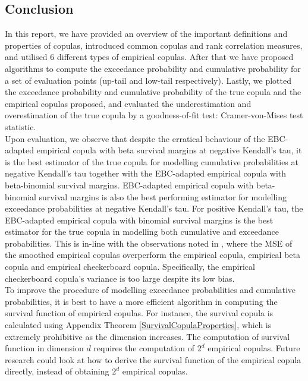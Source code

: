 \documentclass[12pt]{report}
\newcommand{\1}{\mathbf{1}}
\begin{document}
\begin{flushleft}
\section{Conclusion}
\vspace{0.5cm}
In this report, we have provided an overview of the important definitions and properties of copulas, introduced common copulas and rank correlation measures, and utilised 6 different types of empirical copulas. After that we have proposed algorithms to compute the exceedance probability and cumulative probability for a set of evaluation points (up-tail and low-tail respectively). Lastly, we plotted the exceedance probability and cumulative probability of the true copula and the empirical copulas proposed, and evaluated the underestimation and overestimation of the true copula by a goodness-of-fit test: Cramer-von-Mises test statistic.\\
\vspace{0.5cm}
Upon evaluation, we observe that despite the erratical behaviour of the EBC-adapted empirical copula with beta survival margins at negative Kendall's tau, it is the best estimator of the true copula for modelling cumulative probabilities at negative Kendall's tau together with the EBC-adapted empirical copula with beta-binomial survival margins. EBC-adapted empirical copula with beta-binomial survival margins is also the best performing estimator for modelling exceedance probabilities at negative Kendall's tau. For positive Kendall's tau, the EBC-adapted empirical copula with binomial survival margins is the best estimator for the true copula in modelling both cumulative and exceedance probabilities. This is in-line with the observations noted in \cite{KojadinovicYi2024Smooth}, where the MSE of the smoothed empirical copulas overperform the empirical copula, empirical beta copula and empirical checkerboard copula. Specifically, the empirical checkerboard copula's variance is too large despite its low bias.\\
\vspace{0.5cm}
To improve the procedure of modelling exceedance probabilities and cumulative probabilities, it is best to have a more efficient algorithm in computing the survival function of empirical copulas. For instance, the survival copula is calculated using Appendix Theorem \ref{SurvivalCopulaProperties}, which is extremely prohibitive as the dimension increases. The computation of survival function in dimension $d$ requires the computation of $2^{d}$ empirical copulas. Future research could look at how to derive the survival function of the empirical copula directly, instead of obtaining $2^{d}$ empirical copulas.\\

\end{flushleft}
\end{document}
